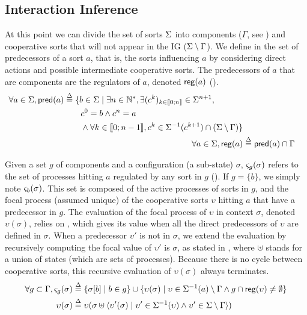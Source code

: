 \subsection{Interaction Inference}\label{ssec:infer-IG}

At this point we can divide the set of sorts $\Sigma$ into components ($\Gamma$, see ) and cooperative sorts
that will not appear in the IG ($\Sigma \setminus \Gamma$).
We define in  the set of predecessors of a sort $a$, that is, the sorts influencing $a$
by considering direct actions and possible intermediate cooperative sorts.
The predecessors of $a$ that are components are the regulators of $a$, denoted $\mathsf{reg}({a})$
().
\begin{align}
\begin{split}
\forall a \in \Sigma, \mathsf{pred}(a) &\stackrel{\Delta}= \{b \in \Sigma \mid \exists n \in \mathbb{N}^*, \exists
(c^k)_{k \in \llbracket 0 ; n \rrbracket} \in \Sigma^{n+1}, \\
                                   & \quad \quad c^0 = b \wedge c^n = a \\
                                   & \quad \quad \wedge \forall k \in \llbracket 0 ; n-1 \rrbracket,
                   c^k \in \Sigma^{-1}(c^{k+1}) \cap (\Sigma\setminus\Gamma)\}
\end{split}
\label{eq:ph_predec}
\\
\forall a\in \Sigma, \mathsf{reg}({a}) & \stackrel{\Delta}= \mathsf{pred}(a) \cap \Gamma
\label{eq:regulators}
\end{align}

Given a set $g$ of components and a configuration (\ie a sub-state) $\sigma$, $\varsigma_g(\sigma)$
refers to the set of processes hitting $a$ regulated by any sort in $g$ ().
If $g=\{b\}$, we simply note $\varsigma_b(\sigma)$.
This set is composed of the active processes of sorts in $g$, and the focal process (assumed
unique) of the cooperative sorts $\upsilon$ hitting $a$ that have a predecessor in $g$.
The evaluation of the focal process of $\upsilon$ in context $\sigma$, denoted $\upsilon(\sigma)$,
relies on , which gives its value when all the direct predecessors of
$\upsilon$ are defined in $\sigma$.
When a predecessor $\upsilon'$ is not in $\sigma$, we extend the evaluation by recursively computing
the focal value of $\upsilon'$ is $\sigma$, as stated in ,
where $\uplus$ stands for a union of states (which are sets of processes).
Because there is no cycle between cooperative sorts, this recursive evaluation of $\upsilon(\sigma)$
always terminates.
\begin{align}
\forall g\subset \Gamma,
  \varsigma_g(\sigma) & \stackrel{\Delta}= \{ \sigma[b] \mid b\in g \} \cup \{ \upsilon(\sigma) \mid
\upsilon\in\Sigma^{-1}(a) \setminus \Gamma \wedge g\cap \mathsf{reg}({\upsilon}) \neq \emptyset \}
\label{eq:ctx-sigma}
\\
\upsilon(\sigma) & \stackrel{\Delta}=
\upsilon(\sigma \uplus \langle \upsilon'(\sigma) \mid 
  \upsilon'\in\Sigma^{-1}(\upsilon) \wedge
  \upsilon'\in\Sigma\setminus\Gamma  \rangle)
\label{eq:cooperative-eval}
\end{align}

